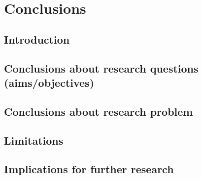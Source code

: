 \chapter{Conclusions}

\section{Introduction}

\section{Conclusions about research questions (aims/objectives)}

\section{Conclusions about research problem}

\section{Limitations}

\section{Implications for further research}
